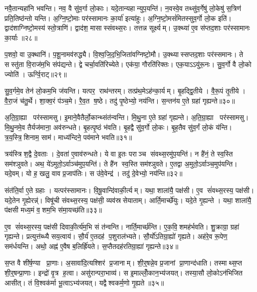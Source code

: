 नवै॒तान्यहा॑नि भवन्ति। नव॒ वै सु॑व॒र्गा लो॒काः। यदे॒तान्यहान्युप॒यन्ति॑। न॒वस्वे॒व तथ्सु॑व॒र्गेषु॑ लो॒केषु॑ स॒त्रिण॑ प्रति॒तिष्ठ॑न्तो यन्ति। अ॒ग्नि॒ष्टो॒माः पर॑स्सामानः का॒र्या॑ इत्या॑हुः। अ॒ग्नि॒ष्टो॒मसं॑मितस्सुव॒र्गो लो॒क इति॑। द्वाद॑शाग्निष्टो॒मस्य॑ स्तो॒त्राणि॑। द्वाद॑श॒ मासास्संवथ्स॒रः। तत्तन्न सूर्क्ष्यम्। उ॒क्थ्या॑ ए॒व स॑प्तद॒शाः पर॑स्सामानः का॒र्याः॥२८॥

प॒शवो॒ वा उ॒क्थानि॑। प॒शू॒नामव॑रुद्ध्यै। वि॒श्व॒जि॒द॒भि॒जिता॑वग्निष्टो॒मौ। उ॒क्थ्यास्सप्तद॒शाः पर॑स्समानः। ते सस्तु॑ता वि॒राज॑म॒भि संप॑द्यन्ते। द्वे चर्चा॒वति॑रिच्येते। एक॑या॒ गौरति॑रिक्तः। एक॒याऽऽयु॑रू॒नः। सु॒व॒र्गो वै लो॒को ज्योति॑। ऊर्ग्वि॒राट्॥२९॥

सु॒व॒र्गमे॒व तेन॑ लो॒कम॒भि ज॑यन्ति। यत्पर॒ राथ॑न्तरम्। तत्प्र॑थ॒मेऽह॑न्का॒र्यम्। बृ॒हद्द्वि॒तीये। वै॒रू॒पं तृ॒तीये। वै॒रा॒जं च॑तु॒र्थे। शा॒क्व॒रं प॑ञ्च॒मे। रै॒व॒त ष॒ष्ठे। तदु॑ पृ॒ष्ठेभ्यो॒ नय॑न्ति। स॒न्तन॑य ए॒ते ग्रहा॑ गृह्यन्ते॥३०॥

अ॒ति॒ग्रा॒ह्या पर॑स्सामसु। इ॒माने॒वैतैर्लो॒कान्थ्संत॑न्वन्ति। मि॒थु॒ना ए॒ते ग्रहा॑ गृह्यन्ते। अ॒ति॒ग्रा॒ह्या पर॑स्सामसु। मि॒थु॒नमे॒व तैर्यज॑माना॒ अव॑रुन्धते। बृ॒हत्पृ॒ष्ठं भ॑वति। बृ॒हद्वै सु॑व॒र्गो लो॒कः। बृ॒ह॒तैव सु॑व॒र्गं लो॒कं य॑न्ति। त्र॒य॒स्त्रि॒शिनाम॒ साम॑। माध्य॑न्दिने॒ पव॑माने भवति॥३१॥

त्रय॑स्त्रिश॒द्वै दे॒वताः। दे॒वता॑ ए॒वाव॑रुन्धते। ये वा इ॒तः पराञ्च संवथ्स॒रमु॑प॒यन्ति॑। न है॑नं॒ ते स्व॒स्ति सम॑श्ञुवते। अथ॒ ये॑ऽमुतो॒ऽर्वाञ्च॑मुप॒यन्ति॑। ते है॑न स्व॒स्ति सम॑श्ञुवते। ए॒तद्वा अ॒मुतो॒ऽर्वाञ्च॒मुप॑यन्ति। यदे॒वम्। यो ह॒ खलु॒ वाव प्र॒जाप॑तिः। स उ॑वे॒वेन्द्र॑। तदु॑ दे॒वेभ्यो॒ नय॑न्ति॥३२॥\anuvakamend[का॒र्या॑ वि॒राड्गृ॑ह्यन्ते॒ पव॑माने भव॒तीन्द्र॒ एकं॑ च]

संत॑ति॒र्वा ए॒ते ग्रहाः। यत्पर॑स्सामानः। वि॒षू॒वान्दि॑वाकी॒र्त्यम्। यथा॒ शाला॑यै॒ पक्ष॑सी। ए॒व सं॑वथ्स॒रस्य॒ पक्ष॑सी। यदे॒तेन गृ॒ह्येरन्न्॑। विषू॑ची संवथ्स॒रस्य॒ पक्ष॑सी॒ व्यव॑स्रसेयाताम्। आर्ति॒मार्च्छे॑युः। यदे॒ते गृ॒ह्यन्ते। यथा॒ शाला॑यै॒ प॑क्षसी मध्य॒मं व॒शम॒भि स॑मा॒यच्छ॑ति॥३३॥

ए॒व सं॑वथ्स॒रस्य॒ पक्ष॑सी दिवाकी॒र्त्य॑म॒भि सं त॑न्वन्ति। नार्ति॒मार्च्छ॑न्ति। ए॒क॒वि॒शमह॑र्भवति। शु॒क्राग्रा॒ ग्रहा॑ गृह्यन्ते। प्रत्युत्त॑ब्ध्यै सय॒त्वाय॑। सौ॒र्य॑ ए॒तदह॑ प॒शुराल॑भ्यते। सौ॒र्यो॑ऽतिग्रा॒ह्यो॑ गृह्यते। अह॑रे॒व रू॒पेण॒ सम॑र्धयन्ति। अथो॒ अह्न॑ ए॒वैष ब॒लिर्ह्रि॑यते। स॒प्तैतदह॑रतिग्रा॒ह्या॑ गृह्यन्ते॥३४॥

स॒प्त वै शी॑र्\mbox{}ष॒ण्या प्रा॒णाः। अ॒सावा॑दि॒त्यश्शिर॑ प्र॒जानाम्। शी॒र्॒षन्ने॒व प्र॒जानां प्रा॒णान्द॑धाति। तस्माथ्स॒प्त शी॒र्॒षन्प्रा॒णाः। इन्द्रो॑ वृ॒त्र ह॒त्वा। असु॑रान्परा॒भाव्य॑। स इ॒माल्लोँ॒कान॒भ्य॑जयत्। तस्या॒सौ लो॒कोऽन॑भिजित आसीत्। तं वि॒श्वक॑र्मा भू॒त्वाऽभ्य॑जयत्। यद्वैश्वकर्म॒णो गृ॒ह्यते॥३५॥

